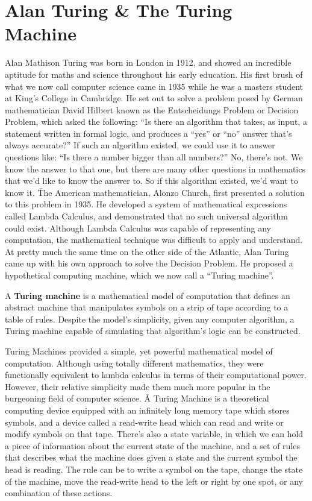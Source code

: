 \section{Alan Turing \& The Turing Machine}

Alan Mathison Turing was born in London in 1912, and showed an incredible aptitude for maths and science throughout
his early education. His first brush of what we now call computer science came in 1935 while he was a masters student
at King's College in Cambridge. He set out to solve a problem posed by German mathematician David Hilbert known as
the Entscheidungs Problem or Decision Problem, which asked the following: ``Is there an algorithm that takes, as
input, a statement written in formal logic, and produces a ``yes'' or ``no'' answer that's always accurate?'' If such
an algorithm existed, we could use it to answer questions like: ``Is there a number bigger than all numbers?'' No,
there's not. We know the answer to that one, but there are many other questions in mathematics that we'd like to know
the answer to. So if this algorithm existed, we'd want to know it. \v

The American mathematician, Alonzo Church, first presented a solution to this problem in 1935. He developed a system
of mathematical expressions called Lambda Calculus, and demonstrated that no such universal algorithm could exist.
Although Lambda Calculus was capable of representing any computation, the mathematical technique was difficult to
apply and understand. At pretty much the same time on the other side of the Atlantic, Alan Turing came up with his
own approach to solve the Decision Problem. He proposed a hypothetical computing machine, which we now call a
``Turing machine''.

A \textbf{Turing machine} is a mathematical model of computation that defines an abstract machine that manipulates
symbols on a strip of tape according to a table of rules. Despite the model's simplicity, given any computer
algorithm, a Turing machine capable of simulating that algorithm's logic can be constructed.
\ed

Turing Machines provided a simple, yet powerful mathematical model of computation. Although using totally different
mathematics, they were functionally equivalent to lambda calculus in terms of their computational power. However,
their relative simplicity made them much more popular in the burgeoning field of computer science. \v

A Turing Machine is a theoretical computing device equipped with an infinitely long memory tape which stores symbols,
and a device called a read-write head which can read and write or modify symbols on that tape. There's also a state
variable, in which we can hold a piece of information about the current state of the machine, and a set of rules that
describes what the machine does given a state and the current symbol the head is reading. The rule can be to write a
symbol on the tape, change the state of the machine, move the read-write head to the left or right by one spot, or
any combination of these actions.

